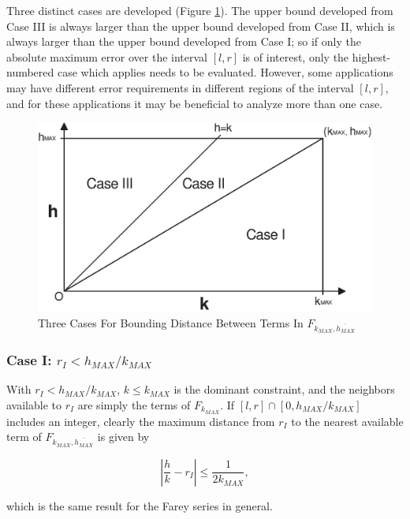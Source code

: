 Three distinct cases are developed (Figure \ref{fig:cfry0:schk0:threecases}).
The upper bound developed from Case III is always larger than the upper
bound developed from Case II, which is always larger than the upper bound developed
from Case I; so if only the absolute maximum error over
the interval $[l,r]$ is of interest, only the
highest-numbered case which applies needs to be evaluated.  However, some
applications may have different error requirements in different regions
of the interval $[l,r]$, and for these applications it may be beneficial
to analyze more than one case.

\begin{figure}
\centering
\includegraphics[width=4.6in]{c_fry0/errreg01.eps}
\caption{Three Cases For Bounding Distance Between Terms In 
         $F_{k_{MAX}, \overline{h_{MAX}}}$}
\label{fig:cfry0:schk0:threecases}
\end{figure}


\subsubsection[Case I:  $r_I < h_{MAX}/k_{MAX}$]
              {Case I:  \mbox{\boldmath $r_I < h_{MAX}/k_{MAX}$}}

With $r_I < h_{MAX}/k_{MAX}$, $k \leq k_{MAX}$ is the dominant
constraint, and the neighbors available to $r_I$ are simply the
terms of $F_{k_{MAX}}$.  If $[l, r] \cap  [0, h_{MAX}/k_{MAX}]$
includes an integer, clearly the maximum distance from $r_I$ to the
nearest available term of $F_{k_{MAX}, \overline{h_{MAX}}}$ is given
by

\begin{equation}
\left|
\frac{h}{k} - r_I
\right|
\leq
\frac{1}{2 k_{MAX}} ,
\end{equation}

which is the same result for the Farey series in general.

